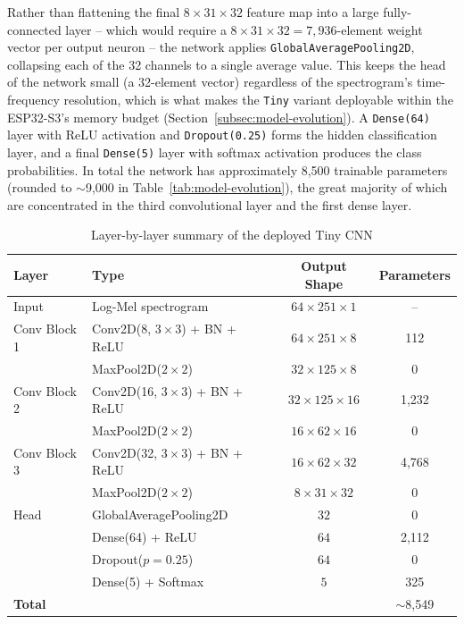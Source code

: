 Rather than flattening the final $8\times31\times32$ feature map into a
large fully-connected layer -- which would require a
$8\times31\times32=7{,}936$-element weight vector per output neuron --
the network applies \texttt{GlobalAveragePooling2D}, collapsing each of the
32 channels to a single average value. This keeps the head of the network
small (a 32-element vector) regardless of the spectrogram's time-frequency
resolution, which is what makes the \texttt{Tiny} variant deployable within
the ESP32-S3's memory budget (Section~\ref{subsec:model-evolution}). A
\texttt{Dense(64)} layer with ReLU activation and \texttt{Dropout(0.25)}
forms the hidden classification layer, and a final \texttt{Dense(5)} layer
with softmax activation produces the class probabilities. In total the
network has approximately 8,500 trainable parameters (rounded to
$\sim$9,000 in Table~\ref{tab:model-evolution}), the great majority of
which are concentrated in the third convolutional layer and the first
dense layer.

\begin{table}[H]
    \centering
    \caption{Layer-by-layer summary of the deployed Tiny CNN}
    \label{tab:cnn-layers}
    \begin{tabular}{llcc}
        \toprule
        \textbf{Layer} & \textbf{Type} & \textbf{Output Shape} & \textbf{Parameters} \\
        \midrule
        Input        & Log-Mel spectrogram                & $64\times251\times1$ & -- \\
        Conv Block 1 & Conv2D(8, $3\times3$) + BN + ReLU   & $64\times251\times8$ & 112 \\
                     & MaxPool2D($2\times2$)               & $32\times125\times8$ & 0 \\
        Conv Block 2 & Conv2D(16, $3\times3$) + BN + ReLU  & $32\times125\times16$ & 1{,}232 \\
                     & MaxPool2D($2\times2$)               & $16\times62\times16$ & 0 \\
        Conv Block 3 & Conv2D(32, $3\times3$) + BN + ReLU  & $16\times62\times32$ & 4{,}768 \\
                     & MaxPool2D($2\times2$)               & $8\times31\times32$ & 0 \\
        Head         & GlobalAveragePooling2D              & $32$ & 0 \\
                     & Dense(64) + ReLU                    & $64$ & 2{,}112 \\
                     & Dropout($p=0.25$)                   & $64$ & 0 \\
                     & Dense(5) + Softmax                  & $5$ & 325 \\
        \midrule
        \textbf{Total} & & & $\sim$8{,}549 \\
        \bottomrule
    \end{tabular}
\end{table}

